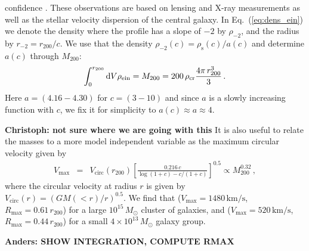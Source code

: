 \documentclass[10pt,aps,pra,reprint,amsmath,amsfonts,amssymb,showpacs,nofootinbib,floatfix]{revtex4-1}
\def\del#1{{}}
\newcommand{\rmn}{\mathrm}
\newcommand{\msun}{M_\odot}
\newcommand{\s}{\rmn{s}}
\newcommand{\dd}{\rmn{d}}
\newcommand{\rhos}{\ensuremath{\rho_s}}
\newcommand{\rs}{\ensuremath{r_s}}
\newcommand{\rvir}{r_{200}}
\newcommand{\mvir}{M_{200}}
\begin{document}
confidence \cite{2011ApJ...728L..39N}. These observations are based on
lensing and X-ray measurements as well as the stellar velocity
dispersion of the central galaxy. In Eq.~(\ref{eq:dens_ein}) we denote
the density where the profile has a slope of $-2$ by $\rho_{-2}$, and
the radius by $r_{-2}=\rvir/c$. We use that the density
$\rho_{-2}(c)=\rho_\s(c)/a(c)$ and determine $a(c)$ through $\mvir$:
\begin{equation}
\int_0^{\rvir}\dd V \rho_{\rm ein} = \mvir = 
200\,\rho_{\rmn{cr}} \frac{4\pi\,\rvir^3}{3} \,.
\end{equation}
Here $a=(4.16-4.30)$ for $c=(3-10)$ and since $a$ is a slowly
increasing function with $c$, we fix it for simplicity to $a(c)\approx
a \approx 4$.

{\bf Christoph: not sure where we are going with this}
It is also useful to relate the masses to a more model independent
variable as the maximum circular velocity given by
\begin{eqnarray}
V_\rmn{max} &=& V_\rmn{circ}(\rvir) 
\left[\frac{0.216\,c}{\log(1+c)-c/(1+c)}\right]^{0.5}\propto \mvir^{0.32}\,,
\end{eqnarray}
where the circular velocity at radius $r$ is given by
$V_\rmn{circ}(r)=(GM(<r)/r)^{0.5}$. We find that
($V_\rmn{max}=1480\,\rmn{km/s}$, $R_\rmn{max}=0.61\,\rvir$) for a large
$10^{15}\,\msun$ cluster of galaxies, and
($V_\rmn{max}=520\,\rmn{km/s}$, $R_\rmn{max}=0.44\,\rvir$) for a small
$4\times10^{13}\,\msun$ galaxy group.

\del{
\begin{eqnarray}
V_\rmn{max} &=& V_\rmn{circ}(r_\rmn{max})\qquad\,\,\,\,\,\,\,\,\,\rmn{where}\nonumber\\
V_\rmn{circ}(r)&=& \sqrt{\frac{G_\rmn{N}\,M(<r)}{r}}\qquad\rmn{and}\nonumber\\
\frac{\dd V_\rmn{circ}(r)}{\dd r} &=& 0\quad \Longrightarrow\quad r_\rmn{max}\,.
\end{eqnarray}
}


\del{Assuming that all the flux from an NFW profile originate from
  within the scale radius $\rs=\rvir/c$, and all the flux from an
  Einasto profile originate within $r_{-2}=\rvir/c$, it follows that
  $\rho_{-2} = \rhos/4$.} {\bf Anders: SHOW INTEGRATION, COMPUTE RMAX}

\end{document}
